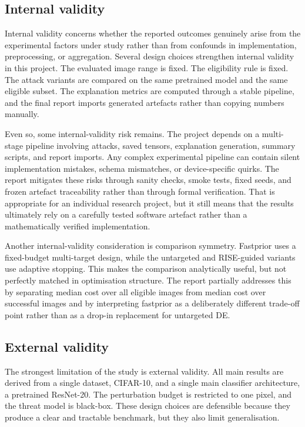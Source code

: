 \subsection{Internal validity}
Internal validity concerns whether the reported outcomes genuinely arise from the experimental factors under study rather than from confounds in implementation, preprocessing, or aggregation.
Several design choices strengthen internal validity in this project.
The evaluated image range is fixed.
The eligibility rule is fixed.
The attack variants are compared on the same pretrained model and the same eligible subset.
The explanation metrics are computed through a stable pipeline, and the final report imports generated artefacts rather than copying numbers manually.

Even so, some internal-validity risk remains.
The project depends on a multi-stage pipeline involving attacks, saved tensors, explanation generation, summary scripts, and report imports.
Any complex experimental pipeline can contain silent implementation mistakes, schema mismatches, or device-specific quirks.
The report mitigates these risks through sanity checks, smoke tests, fixed seeds, and frozen artefact traceability rather than through formal verification.
That is appropriate for an individual research project, but it still means that the results ultimately rely on a carefully tested software artefact rather than a mathematically verified implementation.

Another internal-validity consideration is comparison symmetry.
Fastprior uses a fixed-budget multi-target design, while the untargeted and RISE-guided variants use adaptive stopping.
This makes the comparison analytically useful, but not perfectly matched in optimisation structure.
The report partially addresses this by separating median cost over all eligible images from median cost over successful images and by interpreting fastprior as a deliberately different trade-off point rather than as a drop-in replacement for untargeted DE.

\subsection{External validity}
The strongest limitation of the study is external validity.
All main results are derived from a single dataset, CIFAR-10, and a single main classifier architecture, a pretrained ResNet-20.
The perturbation budget is restricted to one pixel, and the threat model is black-box.
These design choices are defensible because they produce a clear and tractable benchmark, but they also limit generalisation.

